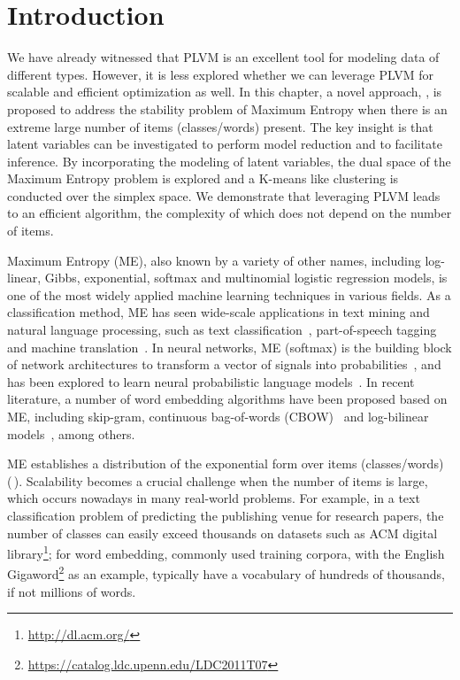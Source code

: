\section{Introduction}

We have already witnessed that PLVM is an excellent tool for modeling data of
different types. However, it is less explored whether we can leverage PLVM for
scalable and efficient optimization as well. In this chapter, a novel approach,
\DCME, is proposed to address the stability problem of Maximum Entropy when
there is an extreme large number of items (classes/words) present. The key
insight is that latent variables can be investigated to perform model reduction
and to facilitate inference. By incorporating the modeling of latent variables,
the dual space of the Maximum Entropy problem is explored and a K-means like
clustering is conducted over the simplex space. We demonstrate that leveraging
PLVM leads to an efficient algorithm, the complexity of which does not depend on
the number of items.

Maximum Entropy (ME), also known by a variety of other names, including
log-linear, Gibbs, exponential, softmax and multinomial logistic regression
models, is one of the most widely applied machine learning techniques in various
fields. As a classification method, ME has seen wide-scale applications in text
mining and natural language processing, such as text
classification~\cite{nigam1999using}, part-of-speech
tagging~\cite{ratnaparkhi1996maximum} and machine
translation~\cite{berger1996maximum}. In neural networks, ME (softmax) is the
building block of network architectures to transform a vector of signals into
probabilities~\cite{collobert2008unified}, and has been explored to learn neural
probabilistic language models~\cite{bengio2003neural}. In recent literature, a
number of word embedding algorithms have been proposed based on ME, including
skip-gram, continuous bag-of-words
(CBOW)~\cite{mikolov2013efficient,mikolov2013distributed} and log-bilinear
models~\cite{mnih2007three}, among others.

ME establishes a distribution of the exponential form over items (classes/words)
(\,). Scalability becomes a crucial challenge when the number of
items is large, which occurs nowadays in many real-world problems.  For example,
in a text classification problem of predicting the publishing venue for research
papers, the number of classes can easily exceed thousands on datasets such as
ACM digital library\footnote{\url{http://dl.acm.org/}}; for word embedding,
commonly used training corpora, with the English
Gigaword\footnote{\url{https://catalog.ldc.upenn.edu/LDC2011T07}} as an example,
typically have a vocabulary of hundreds of thousands, if not millions of words.


